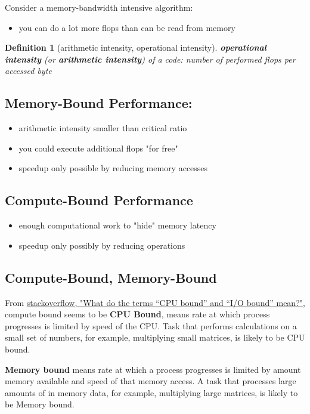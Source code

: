 \documentclass[10pt]{amsart}
\newtheorem{definition}{Definition}
\begin{document}
\begin{multicols*}{2}
Consider a memory-bandwidth intensive algorithm: 
\begin{itemize}
	\item you can do a lot more flops than can be read from memory
\end{itemize}
\begin{definition}[arithmetic intensity, operational intensity]
	\textbf{operational intensity} (or \textbf{arithmetic intensity}) of a code: number of performed flops per accessed byte
\end{definition}

\subsection{Memory-Bound Performance:}
\begin{itemize}
	\item arithmetic intensity smaller than critical ratio
	\item you could execute additional flops "for free"
	\item speedup only possible by reducing memory accesses
\end{itemize}



\subsection{Compute-Bound Performance}
\begin{itemize}
	\item enough computational work to "hide" memory latency 
	\item speedup only possibly by reducing operations
\end{itemize}

\subsection{Compute-Bound, Memory-Bound}

From \href{https://stackoverflow.com/questions/868568/what-do-the-terms-cpu-bound-and-i-o-bound-mean}{stackoverflow, "What do the terms “CPU bound” and “I/O bound” mean?"}, compute bound seems to be \textbf{CPU Bound}, means rate at which process progresses is limited by speed of the CPU.  Task that performs calculations on a small set of numbers, for example, multiplying small matrices, is likely to be CPU bound.  

\textbf{Memory bound} means rate at which a process progresses is limited by amount memory available and speed of that memory access.  A task that processes large amounts of in memory data, for example, multiplying large matrices, is likely to be Memory bound.  





\end{multicols*}
\end{document}

